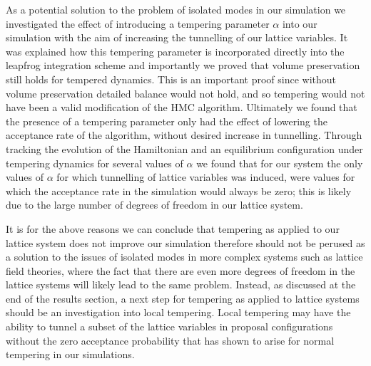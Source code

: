 \documentclass[12pt]{article}
\begin{document}
    As a potential solution to the problem of isolated modes in our simulation we investigated the effect of introducing a tempering parameter $\alpha$ into our simulation with the aim of increasing the tunnelling of our lattice variables. It was explained how this tempering parameter is incorporated directly into the leapfrog integration scheme and importantly we proved that volume preservation still holds for tempered dynamics. This is an important proof since without volume preservation detailed balance would not hold, and so tempering would not have been a valid modification of the HMC algorithm. Ultimately we found that the presence of a tempering parameter only had the effect of lowering the acceptance rate of the algorithm, without desired increase in tunnelling. Through tracking the evolution of the Hamiltonian and an equilibrium configuration under tempering dynamics for several values of $\alpha$ we found that for our system the only values of $\alpha$ for which tunnelling of lattice variables was induced, were values for which the acceptance rate in the simulation would always be zero; this is likely due to the large number of degrees of freedom in our lattice system. 

    It is for the above reasons we can conclude that tempering as applied to our lattice system does not improve our simulation therefore should not be perused as a solution to the issues of isolated modes in more complex systems such as lattice field theories, where the fact that there are even more degrees of freedom in the lattice systems will likely lead to the same problem. Instead, as discussed at the end of the results section, a next step for tempering as applied to lattice systems should be an investigation into local tempering. Local tempering may have the ability to tunnel a subset of the lattice variables in proposal configurations without the zero acceptance probability that has shown to arise for normal tempering in our simulations. 










\end{document}
